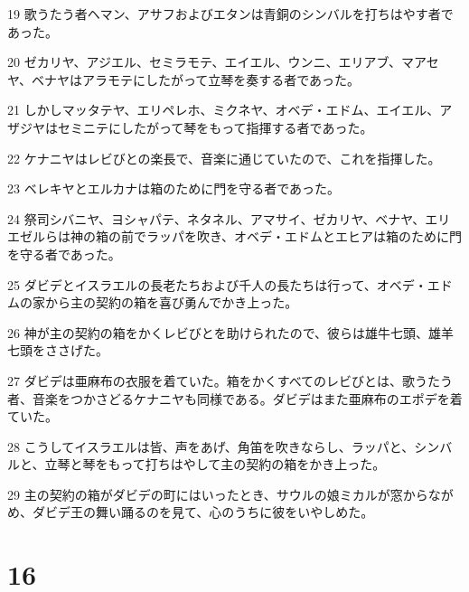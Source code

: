 \par 19 歌うたう者ヘマン、アサフおよびエタンは青銅のシンバルを打ちはやす者であった。
\par 20 ゼカリヤ、アジエル、セミラモテ、エイエル、ウンニ、エリアブ、マアセヤ、ベナヤはアラモテにしたがって立琴を奏する者であった。
\par 21 しかしマッタテヤ、エリペレホ、ミクネヤ、オベデ・エドム、エイエル、アザジヤはセミニテにしたがって琴をもって指揮する者であった。
\par 22 ケナニヤはレビびとの楽長で、音楽に通じていたので、これを指揮した。
\par 23 ベレキヤとエルカナは箱のために門を守る者であった。
\par 24 祭司シバニヤ、ヨシャパテ、ネタネル、アマサイ、ゼカリヤ、ベナヤ、エリエゼルらは神の箱の前でラッパを吹き、オベデ・エドムとエヒアは箱のために門を守る者であった。
\par 25 ダビデとイスラエルの長老たちおよび千人の長たちは行って、オベデ・エドムの家から主の契約の箱を喜び勇んでかき上った。
\par 26 神が主の契約の箱をかくレビびとを助けられたので、彼らは雄牛七頭、雄羊七頭をささげた。
\par 27 ダビデは亜麻布の衣服を着ていた。箱をかくすべてのレビびとは、歌うたう者、音楽をつかさどるケナニヤも同様である。ダビデはまた亜麻布のエポデを着ていた。
\par 28 こうしてイスラエルは皆、声をあげ、角笛を吹きならし、ラッパと、シンバルと、立琴と琴をもって打ちはやして主の契約の箱をかき上った。
\par 29 主の契約の箱がダビデの町にはいったとき、サウルの娘ミカルが窓からながめ、ダビデ王の舞い踊るのを見て、心のうちに彼をいやしめた。

\chapter{16}

